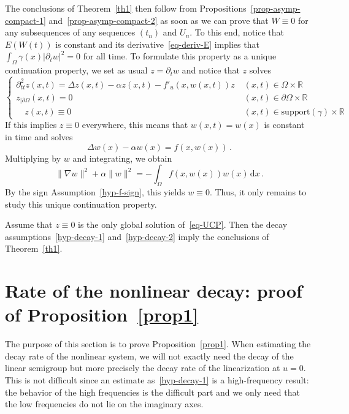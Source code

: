 \documentclass[10pt]{amsart}
\theoremstyle{definition}\newtheorem{defi}[theo]{Definition}\newtheorem{rema}[theo]{Remark}\newtheorem{exam}[theo]{Example}\newtheorem{exem}[theo]{Example}\newtheorem{nota}[theo]{Notation}
\newcommand{\RR}{\mathbb{R}}
\newcommand{\drm}{\mathrm{d}}
\newcommand{\grad}{\nabla}
\begin{document}
The conclusions of Theorem~\ref{th1} then follow from Propositions~\ref{prop-asymp-compact-1} and~\ref{prop-asymp-compact-2} as soon as we can prove that $W\equiv 0$ for any subsequences of any sequences $(t_n)$ and $U_n$. To this end, notice that $E(W(t))$ is constant and its derivative~\eqref{eq-deriv-E} implies that $\int_\Omega \gamma(x) |\partial_t w|^2=0$ for all time. To formulate this property as a unique continuation property, we set as usual $z=\partial_t w$ and notice that $z$ solves
\begin{equation}\label{eq-UCP}
\begin{cases}
\partial_{tt}^2 z(x,t) = \Delta z(x,t) - \alpha z(x,t) - f'_u(x,w(x,t)) z\;&(x,t)\in\Omega\times\RR\\
z_{|\partial\Omega}(x,t)=0&(x,t)\in\partial\Omega\times \RR\\
\quad z(x,t)\equiv 0 & (x,t)\in \text{support}(\gamma)\times \RR
\end{cases}
\end{equation}
If this implies $z\equiv 0$ everywhere, this means that $w(x,t)=w(x)$ is constant in time and solves
\[
\Delta w(x)-\alpha w(x)=f(x,w(x))\,.
\]
Multiplying by $w$ and integrating, we obtain
\[
\|\grad w\|^2 +\alpha \|w\|^2 = -\int_\Omega f(x,w(x))w(x)\,\drm x\,.
\]
By the sign Assumption~\eqref{hyp-f-sign}, this yields $w\equiv 0$. Thus, it only remains to study this unique continuation property.

\begin{prop}\label{prop-UCP-implique-th}
Assume that $z\equiv 0$ is the only global solution of~\eqref{eq-UCP}. Then the decay assumptions~\eqref{hyp-decay-1} and~\eqref{hyp-decay-2} imply the conclusions of Theorem~\ref{th1}.
\end{prop}


\section{Rate of the nonlinear decay: proof of Proposition~\ref{prop1}}\label{section-decay}
The purpose of this section is to prove Proposition~\ref{prop1}. When estimating the decay rate of the nonlinear system, we will not exactly need the decay of the linear semigroup but more precisely the decay rate of the linearization at $u=0$. This is not difficult since an estimate as~\eqref{hyp-decay-1} is a high-frequency result: the behavior of the high frequencies is the difficult part and we only need that the low frequencies do not lie on the imaginary axes.
\end{document}
